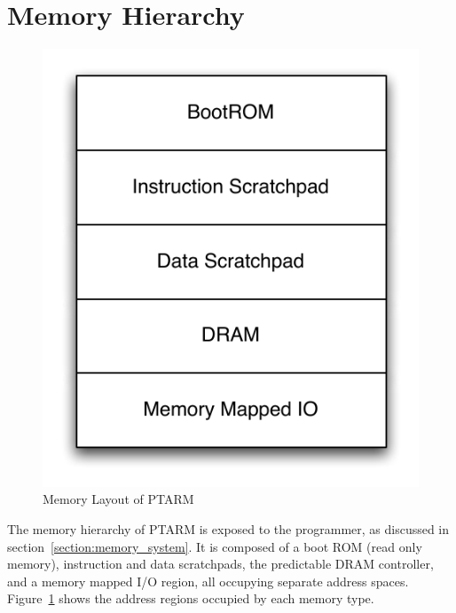 \section{Memory Hierarchy}
\label{sec:ptarm_memory}


\begin{figure}
  \vspace{-20pt}
  \begin{center}
    \includegraphics[scale=.65]{figs/ptarm_memory_layout}
  \end{center}
  \vspace{-20pt}
  \caption{Memory Layout of PTARM}
  \label{fig:ptarm_memory_layout}
  \vspace{-10pt}
\end{figure} 
The memory hierarchy of PTARM is exposed to the programmer, as discussed in section~\ref{section:memory_system}.
It is composed of a boot ROM (read only memory), instruction and data scratchpads, the predictable DRAM controller, and a memory mapped I/O region, all occupying separate address spaces.
Figure~\ref{fig:ptarm_memory_layout} shows the address regions occupied by each memory type.  



